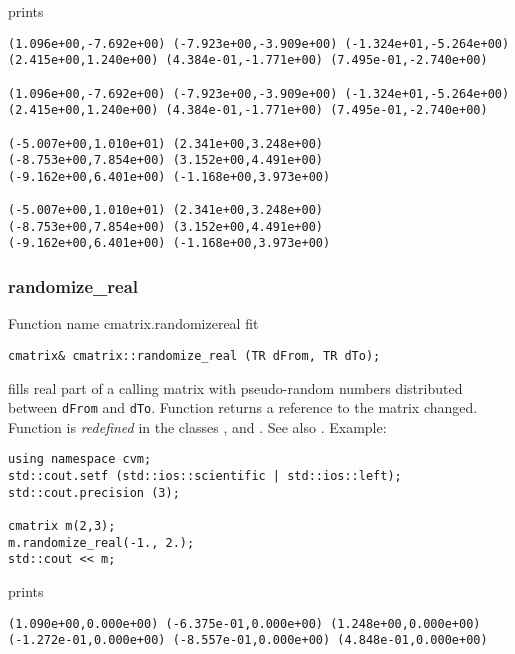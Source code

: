 prints
\begin{Verbatim}
(1.096e+00,-7.692e+00) (-7.923e+00,-3.909e+00) (-1.324e+01,-5.264e+00)
(2.415e+00,1.240e+00) (4.384e-01,-1.771e+00) (7.495e-01,-2.740e+00)

(1.096e+00,-7.692e+00) (-7.923e+00,-3.909e+00) (-1.324e+01,-5.264e+00)
(2.415e+00,1.240e+00) (4.384e-01,-1.771e+00) (7.495e-01,-2.740e+00)

(-5.007e+00,1.010e+01) (2.341e+00,3.248e+00)
(-8.753e+00,7.854e+00) (3.152e+00,4.491e+00)
(-9.162e+00,6.401e+00) (-1.168e+00,3.973e+00)

(-5.007e+00,1.010e+01) (2.341e+00,3.248e+00)
(-8.753e+00,7.854e+00) (3.152e+00,4.491e+00)
(-9.162e+00,6.401e+00) (-1.168e+00,3.973e+00)
\end{Verbatim}
\newpage



\subsubsection{randomize\_real}
Function%
\pdfdest name {cmatrix.randomizereal} fit
\begin{verbatim}
cmatrix& cmatrix::randomize_real (TR dFrom, TR dTo);
\end{verbatim}
fills  real part of a calling matrix with 
pseudo-random numbers distributed between
\verb"dFrom" and \verb"dTo".
Function
returns a reference to the matrix changed.
Function is \emph{redefined} in the classes
,  and
.
See also
.
Example:
\begin{Verbatim}
using namespace cvm;
std::cout.setf (std::ios::scientific | std::ios::left); 
std::cout.precision (3);

cmatrix m(2,3);
m.randomize_real(-1., 2.);
std::cout << m;
\end{Verbatim}
prints
\begin{Verbatim}
(1.090e+00,0.000e+00) (-6.375e-01,0.000e+00) (1.248e+00,0.000e+00)
(-1.272e-01,0.000e+00) (-8.557e-01,0.000e+00) (4.848e-01,0.000e+00)
\end{Verbatim}
\newpage


